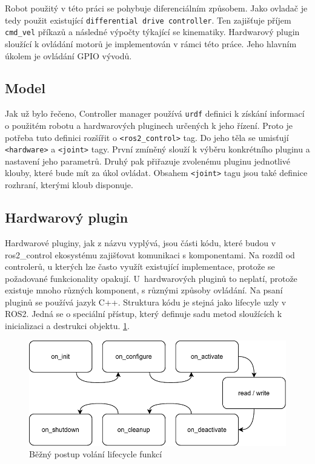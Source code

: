 Robot použitý v této práci se pohybuje diferenciálním způsobem. Jako ovladač je tedy použit existující \verb|differential drive controller|. Ten zajišťuje příjem \verb|cmd_vel| příkazů a následné výpočty týkající se kinematiky. Hardwarový plugin sloužící k ovládání motorů je implementován v rámci této práce. Jeho hlavním úkolem je ovládání GPIO vývodů.

\subsection*{Model}
Jak už bylo řečeno, Controller manager používá \verb|urdf| definici k získání informací o použitém robotu a hardwarových pluginech určených k jeho řízení. Proto je potřeba tuto definici rozšířit o \verb|<ros2_control>| tag. Do jeho těla se umisťují \verb|<hardware>| a \verb|<joint>| tagy. První zmíněný slouží k výběru konkrétního pluginu a nastavení jeho parametrů. Druhý pak přiřazuje zvolenému pluginu jednotlivé klouby, které bude mít za úkol ovládat. Obsahem \verb|<joint>| tagu jsou také definice rozhraní, kterými kloub disponuje. \cite{ros2_control_documentation}

\subsection*{Hardwarový plugin}
Hardwarové pluginy, jak z názvu vyplývá, jsou části kódu, které budou v ros2\_control ekosystému zajišťovat komunikaci s komponentami. Na rozdíl od controlerů, u kterých lze často využít existující implementace, protože se požadované funkcionality opakují. U~hardwarových pluginů to neplatí, protože existuje mnoho různých komponent, s různými způsoby ovládání. Na psaní pluginů se používá jazyk C++. Struktura kódu je stejná jako lifecyle uzly v ROS2. Jedná se o speciální přístup, který definuje sadu metod sloužících k inicializaci a destrukci objektu. \ref{fig:lifecycle_diagram}.

\begin{figure}[h!]
	\centering
	\includegraphics[scale=0.8]{obrazky-figures/ros2_control_wh_plugin_transitions.pdf}
	\caption{Běžný postup volání lifecycle funkcí}
	\label{fig:lifecycle_diagram}
\end{figure}

